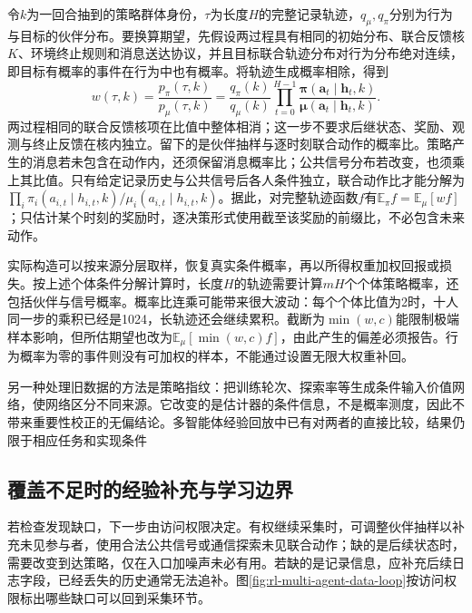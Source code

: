 令$k$为一回合抽到的策略群体身份，$\tau$为长度$H$的完整记录轨迹，$q_\mu,q_\pi$分别为行为与目标的伙伴分布。要换算期望，先假设两过程具有相同的初始分布、联合反馈核$K$、环境终止规则和消息送达协议，并且目标联合轨迹分布对行为分布绝对连续，即目标有概率的事件在行为中也有概率。将轨迹生成概率相除，得到
\begin{equation}
 w(\tau,k)=\frac{p_\pi(\tau,k)}{p_\mu(\tau,k)}
 =\frac{q_\pi(k)}{q_\mu(k)}
   \prod_{t=0}^{H-1}
   \frac{\bm\pi(\bm a_t\mid\bm h_t,k)}
        {\bm\mu(\bm a_t\mid\bm h_t,k)}.
 \label{eq:rl-multi-agent-is}
\end{equation}
两过程相同的联合反馈核项在比值中整体相消；这一步不要求后继状态、奖励、观测与终止反馈在核内独立。留下的是伙伴抽样与逐时刻联合动作的概率比。策略产生的消息若未包含在动作内，还须保留消息概率比；公共信号分布若改变，也须乘上其比值。只有给定记录历史与公共信号后各人条件独立，联合动作比才能分解为$\prod_i\pi_i(a_{i,t}\mid h_{i,t},k)/\mu_i(a_{i,t}\mid h_{i,t},k)$。据此，对完整轨迹函数$f$有$\mathbb E_\pi f=\mathbb E_\mu[wf]$；只估计某个时刻的奖励时，逐决策形式使用截至该奖励的前缀比，不必包含未来动作。

实际构造可以按来源分层取样，恢复真实条件概率，再以所得权重加权回报或损失。按上述个体条件分解计算时，长度$H$的轨迹需要计算$mH$个个体策略概率，还包括伙伴与信号概率。概率比连乘可能带来很大波动：每个个体比值为2时，十人同一步的乘积已经是1024，长轨迹还会继续累积。截断为$\min(w,c)$能限制极端样本影响，但所估期望也改为$\mathbb E_\mu[\min(w,c)f]$，由此产生的偏差必须报告。行为概率为零的事件则没有可加权的样本，不能通过设置无限大权重补回。

另一种处理旧数据的方法是策略指纹：把训练轮次、探索率等生成条件输入价值网络，使网络区分不同来源。它改变的是估计器的条件信息，不是概率测度，因此不带来重要性校正的无偏结论。多智能体经验回放中已有对两者的直接比较，结果仍限于相应任务和实现条件

\subsection{覆盖不足时的经验补充与学习边界}
\label{sec:rl-multi-agent-data-boundary}

若检查发现缺口，下一步由访问权限决定。有权继续采集时，可调整伙伴抽样以补充未见参与者，使用合法公共信号或通信探索未见联合动作；缺的是后续状态时，需要改变到达策略，仅在入口加噪声未必有用。若缺的是记录信息，应补充后续日志字段，已经丢失的历史通常无法追补。图\ref{fig:rl-multi-agent-data-loop}按访问权限标出哪些缺口可以回到采集环节。

